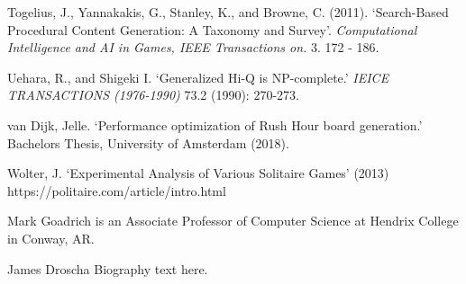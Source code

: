\documentclass[10pt,journal,compsoc]{IEEEtran}
\begin{document}
\begin{thebibliography}{4}
 Togelius, J., Yannakakis, G., Stanley, K., and Browne, C. (2011). `Search-Based Procedural Content Generation: A Taxonomy and Survey'. {\it Computational Intelligence and AI in Games, IEEE Transactions on.} 3. 172 - 186.

 Uehara, R., and Shigeki I. `Generalized Hi-Q is NP-complete.' {\it IEICE TRANSACTIONS (1976-1990)} 73.2 (1990): 270-273.

 van Dijk, Jelle. `Performance optimization of Rush Hour board generation.' Bachelors Thesis, University of Amsterdam (2018).

 Wolter, J. `Experimental Analysis of
Various Solitaire Games' (2013) https://politaire.com/article/intro.html

\end{thebibliography}
% 

\begin{IEEEbiography}{Mark Goadrich}
is an Associate Professor of Computer Science at Hendrix College in Conway, AR.
\end{IEEEbiography}

\begin{IEEEbiography}{James Droscha}
Biography text here.
\end{IEEEbiography}
\end{document}
